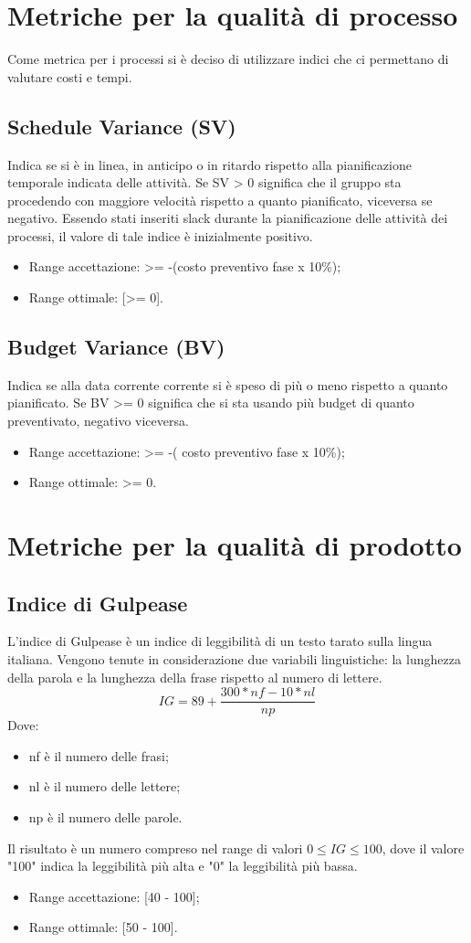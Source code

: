 \section{Metriche per la qualità di processo}\label{ProcessoMetriche}
Come metrica per i processi si è deciso di utilizzare indici che ci permettano di valutare costi e tempi. 
\subsection{Schedule Variance (SV)}
Indica se si è in linea, in anticipo o in ritardo rispetto alla pianificazione temporale indicata delle attività. 
Se SV > 0 significa che il gruppo sta procedendo con maggiore velocità rispetto a quanto pianificato, viceversa se negativo. 
Essendo stati inseriti slack durante la pianificazione delle attività dei processi, il valore di tale indice è inizialmente positivo.
\begin{itemize}
	\item Range accettazione: >= -(costo preventivo fase x 10\%);
	\item Range ottimale: [>= 0]. 
\end{itemize}
\subsection{Budget Variance (BV)}
Indica se alla data corrente corrente si è speso di più o meno rispetto a quanto pianificato.
Se BV >= 0 significa che si sta usando più budget di quanto preventivato, negativo viceversa.
\begin{itemize}
	\item  Range accettazione: >= -( costo preventivo fase x 10\%);
	\item Range ottimale: >= 0.
\end{itemize}
\section{Metriche per la qualità di prodotto}
\subsection{Indice di Gulpease} \label{IndicediGulpease}
 L'indice di Gulpease è un indice di leggibilità di un testo tarato sulla lingua italiana. Vengono tenute in considerazione due variabili linguistiche:  la lunghezza della parola e la lunghezza della frase rispetto al numero di lettere.
\[ IG = 89+ \frac{300*nf - 10*nl}{np} \]
Dove:
\begin{itemize}
	\item nf è il numero delle frasi;
	\item nl è il numero delle lettere;
	\item np è il numero delle parole.
\end{itemize}
Il risultato è un numero compreso nel range di valori $0 \le{IG} \le{100}$, dove il valore "100" indica la leggibilità più alta e "0" la leggibilità più bassa.
\begin{itemize}
	\item Range accettazione: [40 - 100];
	\item Range ottimale: [50 - 100].
\end{itemize}

